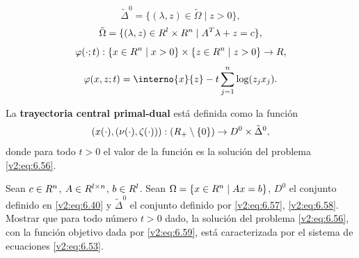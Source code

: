 \begin{equation}
    \tilde{\Delta}^0 = \{ (\lambda, z) \in \tilde{\Omega} \mid z > 0 \},
    \label{v2:eq:6.57}
\end{equation}
\begin{equation}
    \tilde{\Omega} = \{ (\lambda, z) \in R^l \times R^n \mid A^T \lambda + z = c \},
    \label{v2:eq:6.58}
\end{equation}
\[
    \varphi(\cdot; t) : \{ x \in R^n \mid x > 0 \} \times \{ z \in R^n \mid z > 0 \} \to R,
\]
\begin{equation}
    \varphi(x, z; t) = \interno{x}{z} - t \sum_{j=1}^n \log(z_j x_j).
    \label{v2:eq:6.59}
\end{equation}

La \textbf{trayectoria central primal-dual} está definida como la función
\[
    (x(\cdot), (\nu(\cdot), \zeta(\cdot))) : (R_+ \setminus \{0\}) \to D^0 \times \tilde{\Delta}^0,
\]
donde para todo $t > 0$ el valor de la función es la solución del problema \eqref{v2:eq:6.56}.

\begin{exercise}\label{v2:ejer:6.1.20}
    Sean $c \in R^n$, $A \in R^{l \times n}$, $b \in R^l$. Sean $\Omega = \{ x \in R^n \mid Ax = b \}$, $D^0$ el conjunto definido en \eqref{v2:eq:6.40} y $\tilde{\Delta}^0$ el conjunto definido por \eqref{v2:eq:6.57}, \eqref{v2:eq:6.58}.
    Mostrar que para todo número $t > 0$ dado, la solución del problema \eqref{v2:eq:6.56}, con la función objetivo dada por \eqref{v2:eq:6.59}, está caracterizada por el sistema de ecuaciones \eqref{v2:eq:6.53}.
\end{exercise}

